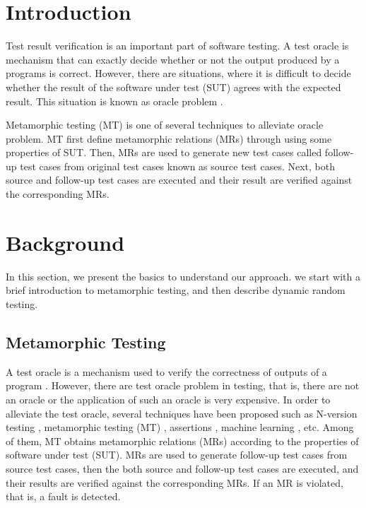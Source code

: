 \documentclass[conference]{IEEEtran}
\begin{document}
\section{Introduction}
\label{section:introduction}
Test result verification is an important part of software testing. A test oracle \cite{weyuker1982testing} is mechanism that can exactly decide whether or not the output
produced by a programs is correct. However, there are situations, where it is difficult to decide whether the result of the software under test (SUT) agrees with the expected
result. This situation is known as oracle problem \cite{barr2015oracle, patel2018mapping}.

Metamorphic testing (MT) \cite{chen1998metamorphic, chen2018metamorphic} is one of several techniques to alleviate oracle problem. MT first define metamorphic relations (MRs)
through using some properties of SUT. Then, MRs are used to generate new test cases called follow-up test cases from original test cases known as source test cases. Next,
both source and follow-up test cases are executed and their result are verified against the corresponding MRs.



\section{Background}
In this section, we present the basics to understand our approach. we start with a brief introduction to metamorphic testing, and then describe dynamic random testing.
\label{section:background}
\subsection{Metamorphic Testing}
\label{section:mt}
A test oracle is a mechanism used to verify the correctness of outputs of a program \cite{weyuker1982testing}. However, there are test oracle problem
\cite{barr2015oracle, patel2018mapping} in testing, that is, there are not an oracle or the application of such an oracle is very expensive. In order to alleviate the test oracle,
several techniques have been proposed such as N-version testing \cite{brilliant1990performance}, metamorphic testing (MT) \cite{chen1998metamorphic},
assertions \cite{sim2014eliminating}, machine learning \cite{chan2009pat}, etc. Among of them, MT obtains metamorphic relations (MRs) according to the properties of software
under test (SUT). MRs are used to generate follow-up test cases from source test cases, then the both source and follow-up test cases are executed, and their results are
verified against the corresponding MRs. If an MR is violated, that is, a fault is detected.
\end{document}
